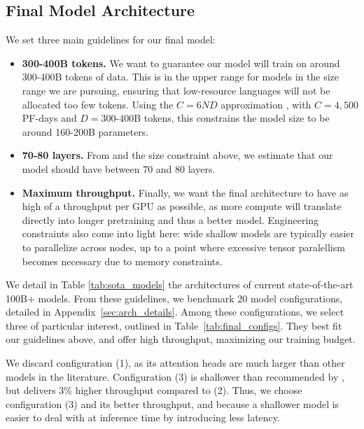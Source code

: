 \subsection{Final Model Architecture}

We set three main guidelines for our final model:
\begin{itemize}[leftmargin=*]
    \item \textbf{300-400B tokens.} 
    We want to guarantee our model will train on around 300-400B tokens of data. This is in the upper range for models in the size range we are pursuing, ensuring that low-resource languages will not be allocated too few tokens. Using the $C=6ND$ approximation \cite{kaplan2020scaling}, with $C=4,500$ PF-days and $D=300$-400B tokens, this constrains the model size to be around 160-200B parameters.
    \item \textbf{70-80 layers.} 
    From \citet{levine2020limits} and the size constraint above, we estimate that our model should have between 70 and 80 layers. 
    \item \textbf{Maximum throughput.}
    Finally, we want the final architecture to have as high of a throughput per GPU as possible, as more compute will translate directly into longer pretraining and thus a better model. Engineering constraints also come into light here: wide shallow models are typically easier to parallelize across nodes, up to a point where excessive tensor paralellism becomes necessary due to memory constraints.
\end{itemize}

We detail in Table \ref{tab:sota_models} the architectures of current state-of-the-art 100B+ models. From these guidelines, we benchmark 20 model configurations, detailed in Appendix~\ref{sec:arch_details}. Among these configurations, we select three of particular interest, outlined in Table~\ref{tab:final_configs}. They best fit our guidelines above, and offer high throughput, maximizing our training budget.

We discard configuration (1), as its attention heads are much larger than other models in the literature. Configuration (3) is shallower than recommended by \citet{levine2020limits}, but delivers 3\% higher throughput compared to (2). Thus, we choose configuration (3) and its better throughput, and because a shallower model is easier to deal with at inference time by introducing less latency. 

